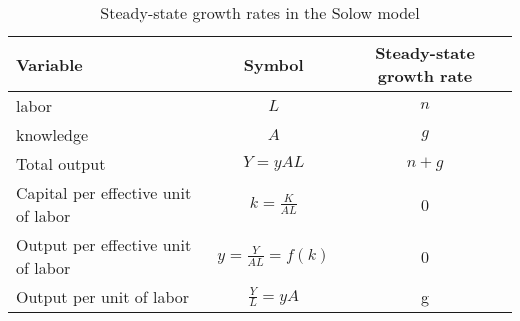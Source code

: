 


%



%

%

\pbn
\begin{table}\centering
	\caption{Steady-state growth rates in the Solow model}\label{tab:steadygrowth}
	\begin{tabular}{lcc}\toprule
		Variable & Symbol & Steady-state growth rate\\\midrule\medskip
		labor & $L$ & $n$\\
		knowledge & $A$& $g$\\
		Total output	& $Y=yAL$			& $n+g$\\
		Capital per effective unit of labor & $k=\frac{K}{AL}$ & 0\\\medskip
		Output per effective unit of labor	& $y=\frac{Y}{AL}=f(k)$& 0\\\medskip
		Output per unit of labor 			& $\frac{Y}{L}=yA$	&g\\\bottomrule
	\end{tabular}
\end{table}

